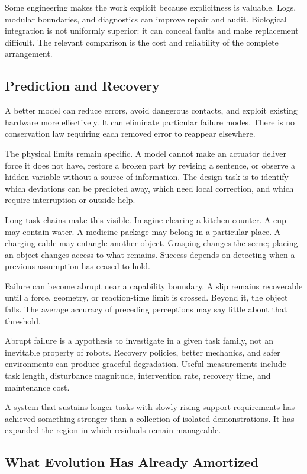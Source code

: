 Some engineering makes the work explicit because explicitness is valuable. Logs, modular boundaries, and diagnostics can improve repair and audit. Biological integration is not uniformly superior: it can conceal faults and make replacement difficult. The relevant comparison is the cost and reliability of the complete arrangement.

\subsection{Prediction and Recovery}

A better model can reduce errors, avoid dangerous contacts, and exploit existing hardware more effectively. It can eliminate particular failure modes. There is no conservation law requiring each removed error to reappear elsewhere.

The physical limits remain specific. A model cannot make an actuator deliver force it does not have, restore a broken part by revising a sentence, or observe a hidden variable without a source of information. The design task is to identify which deviations can be predicted away, which need local correction, and which require interruption or outside help.

Long task chains make this visible. Imagine clearing a kitchen counter. A cup may contain water. A medicine package may belong in a particular place. A charging cable may entangle another object. Grasping changes the scene; placing an object changes access to what remains. Success depends on detecting when a previous assumption has ceased to hold.

Failure can become abrupt near a capability boundary. A slip remains recoverable until a force, geometry, or reaction-time limit is crossed. Beyond it, the object falls. The average accuracy of preceding perceptions may say little about that threshold.

Abrupt failure is a hypothesis to investigate in a given task family, not an inevitable property of robots. Recovery policies, better mechanics, and safer environments can produce graceful degradation. Useful measurements include task length, disturbance magnitude, intervention rate, recovery time, and maintenance cost.

A system that sustains longer tasks with slowly rising support requirements has achieved something stronger than a collection of isolated demonstrations. It has expanded the region in which residuals remain manageable.

\subsection{What Evolution Has Already Amortized}

